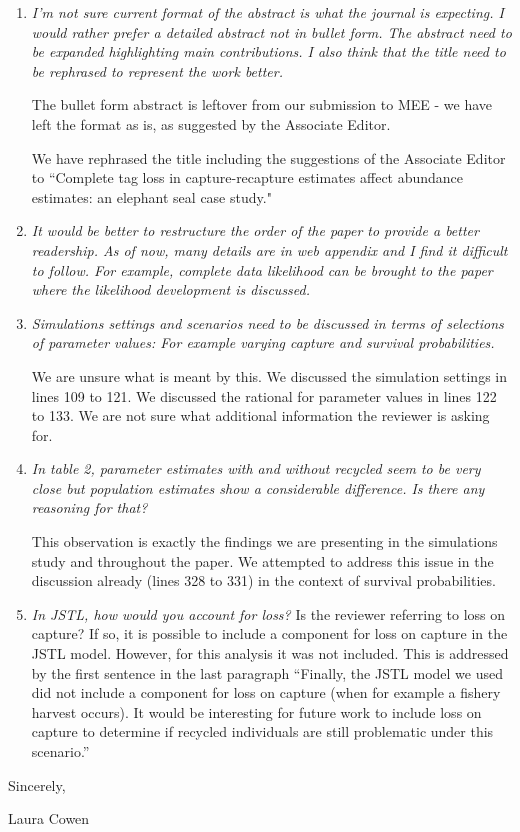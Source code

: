 \documentclass[12pt]{article}
\begin{document}
\begin{enumerate}
\item  {\it I’m not sure current format of the abstract is what the journal is expecting. I would rather prefer a detailed abstract not in bullet form. The abstract need to be expanded highlighting main contributions.   I also think that the title need to be rephrased to represent the work better. }

The bullet form abstract is leftover from our submission to MEE - we have left the format as is, as suggested by the Associate Editor.

We have rephrased the title including the suggestions of the Associate Editor to ``Complete tag loss in capture-recapture estimates affect abundance estimates: an elephant seal case study."

\item {\it It would be better to restructure the order of the paper to provide a better readership. As of now, many details are in web appendix and I find it difficult to follow. For example, complete data likelihood can be brought to the paper where the likelihood development is discussed.}


\item {\it Simulations settings and scenarios need to be discussed in terms of selections of parameter values: For example varying capture and survival probabilities.}

We are unsure what is meant by this. We discussed the simulation settings in lines 109 to 121.  We discussed the rational for parameter values in lines 122 to 133.  We are not sure what additional information the reviewer is asking for.

\item {\it In table 2, parameter estimates with and without recycled seem to be very close but population estimates show a considerable difference. Is there any reasoning for that?}

This observation is exactly the findings we are presenting in the simulations study and throughout the paper.  We attempted to address this issue in the discussion already (lines 328 to 331) in the context of survival probabilities.


\item {\it In JSTL, how would you account for loss?}
Is the reviewer referring to loss on capture? If so, it is possible to include a component for loss on capture in the JSTL model. However, for this analysis it was not included. This is addressed by the first sentence in the last paragraph ``Finally, the JSTL model we used did not include a component for loss on capture (when for example a fishery harvest occurs).  It would be interesting for future work to include loss on capture to determine if recycled individuals are still problematic under this scenario.''
\end{enumerate}




\noindent Sincerely,

\bigskip

\bigskip


\noindent Laura Cowen
\end{document}
